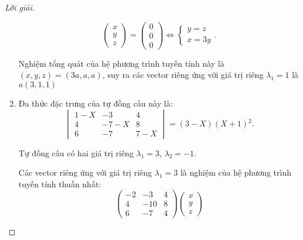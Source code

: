 \documentclass[class=linearalgebra,crop=false]{standalone}
\begin{document}
\begin{proof}[Lời giải]
\begin{enumerate}[label = (\alph*)]
\[                  \begin{pmatrix}
                      x \\
                      y \\
                      z
                  \end{pmatrix}
                  =
                  \begin{pmatrix}
                      0 \\
                      0 \\
                      0
                  \end{pmatrix}
                  \Longleftrightarrow
                  \begin{cases}
                      y = z \\
                      x = 3y
                  \end{cases}.
              \]
              \par Nghiệm tổng quát của hệ phương trình tuyến tính này là $(x, y, z) = (3a, a, a)$, suy ra các vector riêng ứng với giá trị riêng $\lambda_{1} = 1$ là $a(3, 1, 1)$
        \item Đa thức đặc trưng của tự đồng cấu này là:
              \[
                  \begin{vmatrix}
                      1 - X & -3     & 4     \\
                      4     & -7 - X & 8     \\
                      6     & -7     & 7 - X
                  \end{vmatrix}
                  = (3 - X)(X + 1){}^{2}.
              \]
              \par Tự đồng cấu có hai giá trị riêng $\lambda_{1} = 3$, $\lambda_{2} = -1$.
              \par Các vector riêng ứng với giá trị riêng $\lambda_{1} = 3$ là nghiệm của hệ phương trình tuyến tính thuần nhất:
              \[
                  \begin{pmatrix}
                      -2 & -3  & 4 \\
                      4  & -10 & 8 \\
                      6  & -7  & 4
                  \end{pmatrix}
                  \begin{pmatrix}
                      x \\
                      y \\
                      z
                  \end{pmatrix}
\]
\end{enumerate}
\end{proof}
\end{document}

